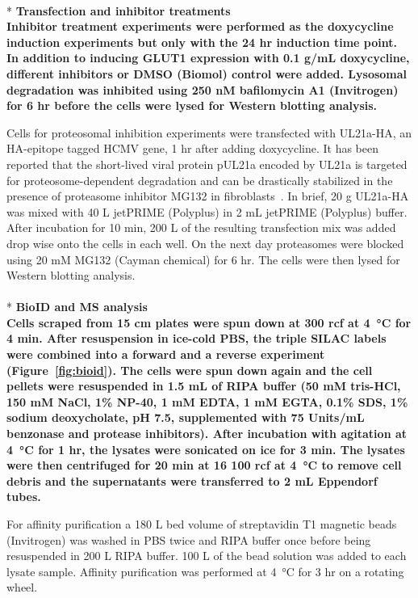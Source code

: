 \\*
\bfseries{Transfection and inhibitor treatments}\\
\normalfont Inhibitor treatment experiments were performed as the doxycycline induction experiments but only with the 24 hr induction time point. In addition to inducing GLUT1 expression with 0.1 \textmu g/mL doxycycline, different inhibitors or DMSO (Biomol) control were added. Lysosomal degradation was inhibited using 250 nM bafilomycin A1 (Invitrogen) for 6 hr before the cells were lysed for Western blotting analysis.

Cells for proteosomal inhibition experiments were transfected with UL21a-HA, an HA-epitope tagged HCMV gene, 1 hr after adding doxycycline. It has been reported that the short-lived viral protein pUL21a encoded by UL21a is targeted for proteosome-dependent degradation and can be drastically stabilized in the presence of proteasome inhibitor MG132 in fibroblasts~\cite{Fehr}. In brief, 20 \textmu g UL21a-HA was mixed with 40 \textmu L jetPRIME (Polyplus) in 2 mL jetPRIME (Polyplus) buffer. After incubation for 10 min, 200 \textmu L of the resulting transfection mix was added drop wise onto the cells in each well. On the next day proteasomes were blocked using 20 mM MG132 (Cayman chemical) for 6 hr. The cells were then lysed for Western blotting analysis.
\\
\\*
\bfseries{BioID and MS analysis}\\
\normalfont Cells scraped from 15 cm plates were spun down at 300 rcf at \SI{4}{\celsius} for 4 min. After resuspension in ice-cold PBS, the triple SILAC labels were combined into a forward and a reverse experiment (Figure~\ref{fig:bioid}). The cells were spun down again and the cell pellets were resuspended in 1.5 mL of RIPA buffer (50 mM tris-HCl, 150 mM NaCl, 1\% NP-40, 1 mM EDTA, 1 mM EGTA, 0.1\% SDS, 1\% sodium deoxycholate, pH 7.5, supplemented with 75 Units/mL benzonase and protease inhibitors). After incubation with agitation at \SI{4}{\celsius} for 1 hr, the lysates were sonicated on ice for 3 min. The lysates were then centrifuged for 20 min at 16 100 rcf at \SI{4}{\celsius} to remove cell debris and the supernatants were transferred to 2 mL Eppendorf tubes.

For affinity purification a 180 {}\textmu L bed volume of streptavidin T1 magnetic beads (Invitrogen) was washed in PBS twice and RIPA buffer once before being resuspended in 200 {}\textmu L RIPA buffer. 100 {}\textmu L of the bead solution was added to each lysate sample. Affinity purification was performed at \SI{4}{\celsius} for 3 hr on a rotating wheel.

